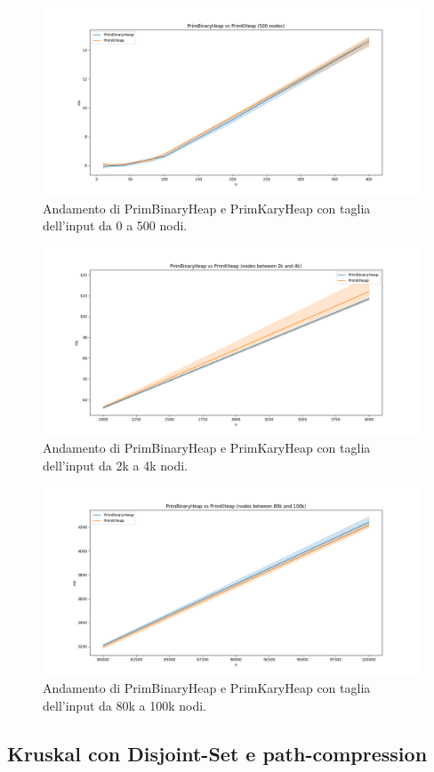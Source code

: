 \begin{figure}[H]
    \centering
    \includegraphics[width=1.0\textwidth]{./images/PrimBinaryHeap_vs_PrimKHeap_(500_nodes).png}
	\caption{Andamento di PrimBinaryHeap e PrimKaryHeap con taglia dell'input da 0 a 500 nodi.}
    \label{fig:Prim2vsPrim4-500}
\end{figure}

\begin{figure}[H]
    \centering
    \includegraphics[width=1.0\textwidth]{./images/PrimBinaryHeap_vs_PrimKHeap_(nodes_between_2k_and_4k).png}
	\caption{Andamento di PrimBinaryHeap e PrimKaryHeap con taglia dell'input da 2k a 4k nodi.}
    \label{fig:Prim2vsPrim4-2k-4k}
\end{figure}

\begin{figure}[H]
    \centering
    \includegraphics[width=1.0\textwidth]{./images/PrimBinaryHeap_vs_PrimKHeap_(nodes_between_80k_and_100k).png}
	\caption{Andamento di PrimBinaryHeap e PrimKaryHeap con taglia dell'input da 80k a 100k nodi.}
    \label{fig:Prim2vsPrim4-80k-100k}
\end{figure}

\subsection{Kruskal con Disjoint-Set e path-compression}

